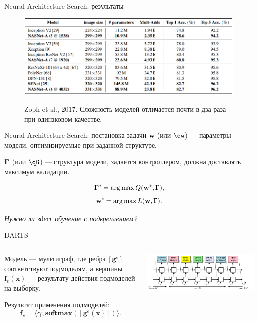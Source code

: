 \documentclass[10pt,pdf,utf8,russian,aspectratio=169]{beamer}
\DeclareMathOperator*{\argmax}{arg\,max}
\begin{document}
\begin{frame}{Neural Architecture Search: результаты}

\begin{figure}
  \centering
 {\includegraphics[width=\textwidth]{zoph.png}}
\label{fig:1}\qquad
\caption*{Zoph et al., 2017.  Сложность моделей отличается почти в два раза при одинаковом качестве.}
\end{figure}

\end{frame}

\begin{frame}{Neural Architecture Search: постановка задачи}
$\mathbf{w}$ (или $\qw$) --- параметры модели, оптимизируемые при заданной структуре.

$\boldsymbol{\Gamma}$ (или $\qG$) --- структура модели, задается контроллером, должна доставлять максимум валидации.

\[
    \Gam^{*} = \argmax Q (\w^{*}, \Gam),
\]
\[
    \w^{*} = \argmax L(\w, \Gam).
\]

\textit{Нужно ли здесь обучение с подкреплением?}
\end{frame}

\begin{frame}{DARTS}
\begin{columns}[T] 
\begin{column}{.48\textwidth}
Модель --- мультиграф, где ребра $[\mathbf{g}^e]$ соответствуют подмоделям, а вершины $\mathbf{f}_v(\mathbf{x})$ --- результату действия подмоделей на выборку. 

Результат применения подмоделей:
\[
    \mathbf{f}_v = \langle\boldsymbol{\gamma}, \textbf{softmax}([\mathbf{g}^e (\mathbf{x})])\rangle.
\]
\end{column}
\begin{column}{.48\textwidth}
\includegraphics[width=\textwidth]{nas_seq.png}
\end{column}
\end{columns}
\end{frame}
\end{document}
